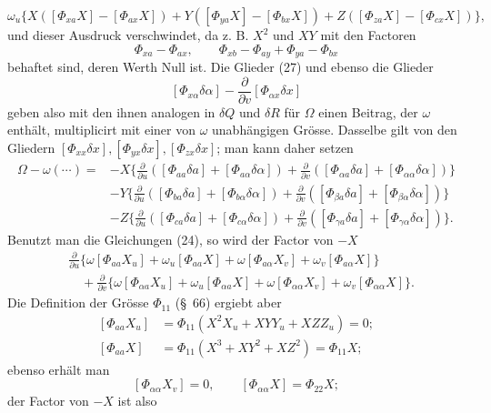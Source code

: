 \documentclass[11pt,a4paper,leqno]{article}
\begin{document}
\[
\omega_u\{X([\Phi_{xa}X]-[\Phi_{ax}X])
+Y([\Phi_{ya}X]-[\Phi_{bx}X])
+Z([\Phi_{za}X]-[\Phi_{cx}X])\},
\]
und dieser Ausdruck verschwindet, da z. B. $X^2$ und $XY$ mit den Factoren
\[
\Phi_{xa}-\Phi_{ax},\qquad
\Phi_{xb}-\Phi_{ay}+\Phi_{ya}-\Phi_{bx}
\]
behaftet sind, deren Werth Null ist. Die Glieder (27) und ebenso die Glieder
\[
[\Phi_{x\alpha}\delta\alpha]
-\frac{\partial}{\partial v}[\Phi_{\alpha x}\delta x]
\]
geben also mit den ihnen analogen in $\delta Q$ und $\delta R$ für $\Omega$
einen Beitrag, der $\omega$ enthält, multiplicirt mit einer von $\omega$
unabhängigen Grösse. Dasselbe gilt von den Gliedern
$[\Phi_{xx}\delta x],[\Phi_{yx}\delta x],[\Phi_{zx}\delta x]$; man kann
daher setzen
\[
\begin{aligned}
\Omega-\omega(\cdots)={}&-X\Biggl\{
\frac{\partial}{\partial u}([\Phi_{aa}\delta a]+[\Phi_{a\alpha}\delta\alpha])
+\frac{\partial}{\partial v}([\Phi_{\alpha a}\delta a]+[\Phi_{\alpha\alpha}\delta\alpha])\Biggr\}\\
&-Y\Biggl\{
\frac{\partial}{\partial u}([\Phi_{ba}\delta a]+[\Phi_{b\alpha}\delta\alpha])
+\frac{\partial}{\partial v}([\Phi_{\beta a}\delta a]+[\Phi_{\beta\alpha}\delta\alpha])\Biggr\}\\
&-Z\Biggl\{
\frac{\partial}{\partial u}([\Phi_{ca}\delta a]+[\Phi_{c\alpha}\delta\alpha])
+\frac{\partial}{\partial v}([\Phi_{\gamma a}\delta a]+[\Phi_{\gamma\alpha}\delta\alpha])\Biggr\}.
\end{aligned}
\]
Benutzt man die Gleichungen (24), so wird der Factor von $-X$
\[
\begin{aligned}
&\frac{\partial}{\partial u}\{\omega[\Phi_{aa}X_u]
+\omega_u[\Phi_{aa}X]+\omega[\Phi_{a\alpha}X_v]
+\omega_v[\Phi_{a\alpha}X]\}\\
&\quad+\frac{\partial}{\partial v}\{\omega[\Phi_{\alpha a}X_u]
+\omega_u[\Phi_{\alpha a}X]+\omega[\Phi_{\alpha\alpha}X_v]
+\omega_v[\Phi_{\alpha\alpha}X]\}.
\end{aligned}
\]
Die Definition der Grösse $\Phi_{11}$ (\S~66) ergiebt aber
\[
\begin{aligned}
[\Phi_{aa}X_u]&=\Phi_{11}(X^2X_u+XYY_u+XZZ_u)=0;\\
[\Phi_{aa}X]&=\Phi_{11}(X^3+XY^2+XZ^2)=\Phi_{11}X;
\end{aligned}
\]
ebenso erhält man
\[
[\Phi_{\alpha\alpha}X_v]=0,\qquad
[\Phi_{\alpha\alpha}X]=\Phi_{22}X;
\]
der Factor von $-X$ ist also
\end{document}
